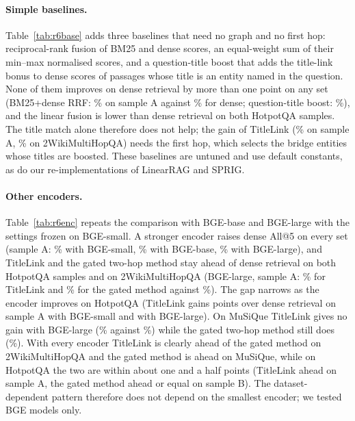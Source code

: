 \documentclass[a4paper,fleqn]{cas-sc}
\begin{document}
\paragraph{Simple baselines.} Table~\ref{tab:r6base} adds three baselines that need no graph and no first hop: reciprocal-rank fusion of BM25 and dense scores, an equal-weight sum of their min--max normalised scores, and a question-title boost that adds the title-link bonus to dense scores of passages whose title is an entity named in the question. None of them improves on dense retrieval by more than one point on any set (BM25+dense RRF: \RbARrf\% on sample A against \RbADense\% for dense; question-title boost: \RbAQt\%), and the linear fusion is lower than dense retrieval on both HotpotQA samples. The title match alone therefore does not help; the gain of TitleLink (\RbATl\% on sample A, \RbWTl\% on 2WikiMultiHopQA) needs the first hop, which selects the bridge entities whose titles are boosted. These baselines are untuned and use default constants, as do our re-implementations of LinearRAG and SPRIG.

\paragraph{Other encoders.} Table~\ref{tab:r6enc} repeats the comparison with BGE-base and BGE-large with the settings frozen on BGE-small. A stronger encoder raises dense All@5 on every set (sample A: \ReSmallADense\% with BGE-small, \ReBaseADense\% with BGE-base, \ReLargeADense\% with BGE-large), and TitleLink and the gated two-hop method stay ahead of dense retrieval on both HotpotQA samples and on 2WikiMultiHopQA (BGE-large, sample A: \ReLargeATl\% for TitleLink and \ReLargeAGate\% for the gated method against \ReLargeADense\%). The gap narrows as the encoder improves on HotpotQA (TitleLink gains \ReSmallATlGap{} points over dense retrieval on sample A with BGE-small and \ReLargeATlGap{} with BGE-large). On MuSiQue TitleLink gives no gain with BGE-large (\ReLargeQTl\% against \ReLargeQDense\%) while the gated two-hop method still does (\ReLargeQGate\%). With every encoder TitleLink is clearly ahead of the gated method on 2WikiMultiHopQA and the gated method is ahead on MuSiQue, while on HotpotQA the two are within about one and a half points (TitleLink ahead on sample A, the gated method ahead or equal on sample B). The dataset-dependent pattern therefore does not depend on the smallest encoder; we tested BGE models only.

\end{document}
